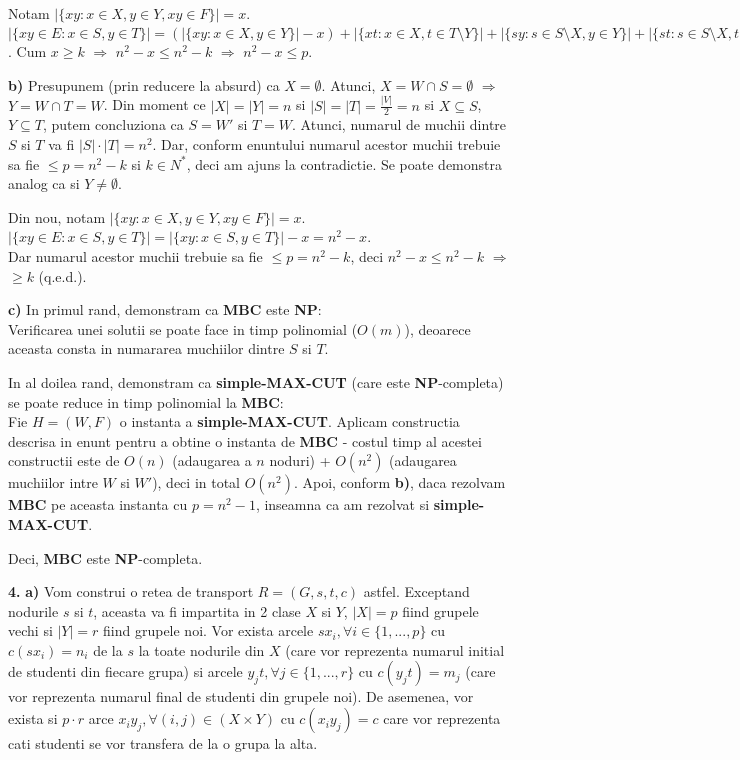 \documentclass{article}
\begin{document}
Notam $|\{xy: x \in X, y \in Y, xy \in F\}| = x$.\\
$|\{xy \in E: x \in S, y \in T\}|=(|\{xy: x \in X, y \in Y\}| - x)+|\{xt: x \in X, t \in T \setminus Y\}|+|\{sy: s \in S \setminus X, y \in Y\}|+|\{st: s \in S \setminus X, t \in T \setminus Y\}| = [r(n-r) - s] + r(n-r) + r^2 + (n-r)^2 = n^2 - x$. Cum $x \geq k$ $\Rightarrow$ $n^2 - x \leq n^2 - k$ $\Rightarrow$ $n^2 - x \leq p$.


{\bf b)} Presupunem (prin reducere la absurd) ca $X = \emptyset$. Atunci, $X = W \cap S = \emptyset$ $\Rightarrow$ $Y = W \cap T = W$. Din moment ce $|X| = |Y| = n$ si $|S| = |T| = \frac{|V|}{2} =n$ si $X \subseteq S$, $Y \subseteq T$, putem concluziona ca $S = W'$ si $T = W$. Atunci, numarul de muchii dintre $S$ si $T$ va fi $|S| \cdot |T| = n^2$. Dar, conform enuntului numarul acestor muchii trebuie sa fie $\leq p = n^2 - k$ si $k \in N^*$, deci am ajuns la contradictie. Se poate demonstra analog ca si $Y \neq \emptyset$.

Din nou, notam $|\{xy: x \in X, y \in Y, xy \in F\}| = x$.\\
$|\{xy \in E: x \in S, y \in T\}| = |\{xy: x \in S, y \in T\}| - x = n^2 - x$.\\
Dar numarul acestor muchii trebuie sa fie $ \leq p = n^2 - k$, deci $n^2 - x \leq n^2 -k$ $\Rightarrow$ $ \geq k$ (q.e.d.).


{\bf c)} In primul rand, demonstram ca {\bf MBC} este {\bf NP}:\\
Verificarea unei solutii se poate face in timp polinomial ($O(m)$), deoarece aceasta consta in numararea muchiilor dintre $S$ si $T$.

In al doilea rand, demonstram ca {\bf simple-MAX-CUT} (care este {\bf NP}-completa) se poate reduce in timp polinomial la {\bf MBC}:\\
Fie $H=(W,F)$ o instanta a {\bf simple-MAX-CUT}. Aplicam constructia descrisa in enunt pentru a obtine o instanta de {\bf MBC} - costul timp al acestei constructii este de $O(n)$ (adaugarea a $n$ noduri) + $O(n^2)$ (adaugarea muchiilor intre $W$ si $W'$), deci in total $O(n^2)$. Apoi, conform {\bf b)}, daca rezolvam {\bf MBC} pe aceasta instanta cu $p = n^2 - 1$, inseamna ca am rezolvat si {\bf simple-MAX-CUT}.

Deci, {\bf MBC} este {\bf NP}-completa.


\vspace{1cm}

{\bf 4.} {\bf a)} Vom construi o retea de transport $R = (G, s, t, c)$ astfel. Exceptand nodurile $s$ si $t$, aceasta va fi impartita in 2 clase $X$ si $Y$, $|X| = p$ fiind grupele vechi si $|Y| = r$ fiind grupele noi. Vor exista arcele $sx_i, \forall i \in \{1,...,p\}$ cu $c(sx_i) = n_i$ de la $s$ la toate nodurile din $X$ (care vor reprezenta numarul initial de studenti din fiecare grupa) si arcele $y_jt, \forall j \in \{1,...,r\}$ cu $c(y_jt) = m_j$ (care vor reprezenta numarul final de studenti din grupele noi). De asemenea, vor exista si $p \cdot r$ arce $x_iy_j, \forall (i,j) \in (X \times Y)$ cu $c(x_iy_j) = c$ care vor reprezenta cati studenti se vor transfera de la o grupa la alta.
\end{document}
